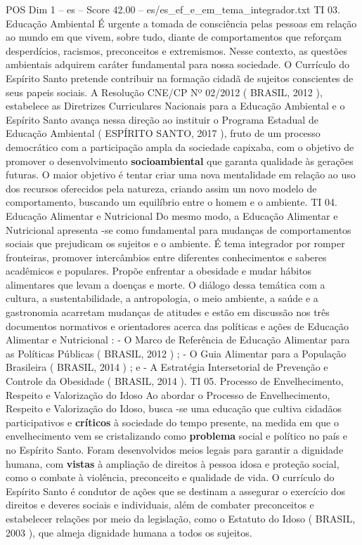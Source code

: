 \begin{textsample}{POS Dim 1 – es – Score 42.00 – es/es\_ef\_e\_em\_tema\_integrador.txt}
TI 03.
Educação Ambiental É urgente a tomada de consciência pelas pessoas em relação ao mundo em que vivem, sobre tudo, diante de comportamentos que reforçam desperdícios, racismos, preconceitos e extremismos.
Nesse contexto, as questões ambientais adquirem caráter fundamental para nossa sociedade.
O Currículo do Espírito Santo pretende contribuir na formação cidadã de sujeitos conscientes de seus papeis sociais.
A Resolução CNE/CP Nº 02/2012 ( BRASIL, 2012 ), estabelece as Diretrizes Curriculares Nacionais para a Educação Ambiental e o Espírito Santo avança nessa direção ao instituir o Programa Estadual de Educação Ambiental ( ESPÍRITO SANTO, 2017 ), fruto de um processo democrático com a participação ampla da sociedade capixaba, com o objetivo de promover o desenvolvimento \textbf{socioambiental} que garanta qualidade às gerações futuras.
O maior objetivo é tentar criar uma nova mentalidade em relação ao uso dos recursos oferecidos pela natureza, criando assim um novo modelo de comportamento, buscando um equilíbrio entre o homem e o ambiente.
TI 04.
Educação Alimentar e Nutricional Do mesmo modo, a Educação Alimentar e Nutricional apresenta -se como fundamental para mudanças de comportamentos sociais que prejudicam os sujeitos e o ambiente.
É tema integrador por romper fronteiras, promover intercâmbios entre diferentes conhecimentos e saberes acadêmicos e populares.
Propõe enfrentar a obesidade e mudar hábitos alimentares que levam a doenças e morte.
O diálogo dessa temática com a cultura, a sustentabilidade, a antropologia, o meio ambiente, a saúde e a gastronomia acarretam mudanças de atitudes e estão em discussão nos três documentos normativos e orientadores acerca das políticas e ações de Educação Alimentar e Nutricional : - O Marco de Referência de Educação Alimentar para as Políticas Públicas ( BRASIL, 2012 ) ; - O Guia Alimentar para a População Brasileira ( BRASIL, 2014 ) ; e - A Estratégia Intersetorial de Prevenção e Controle da Obesidade ( BRASIL, 2014 ).
TI 05.
Processo de Envelhecimento, Respeito e Valorização do Idoso Ao abordar o Processo de Envelhecimento, Respeito e Valorização do Idoso, busca -se uma educação que cultiva cidadãos participativos e \textbf{críticos} à sociedade do tempo presente, na medida em que o envelhecimento vem se cristalizando como \textbf{problema} social e político no país e no Espírito Santo.
Foram desenvolvidos meios legais para garantir a dignidade humana, com \textbf{vistas} à ampliação de direitos à pessoa idosa e proteção social, como o combate à violência, preconceito e qualidade de vida.
O currículo do Espírito Santo é condutor de ações que se destinam a assegurar o exercício dos direitos e deveres sociais e individuais, além de combater preconceitos e estabelecer relações por meio da legislação, como o Estatuto do Idoso ( BRASIL, 2003 ), que almeja dignidade humana a todos os sujeitos.

\end{textsample}
